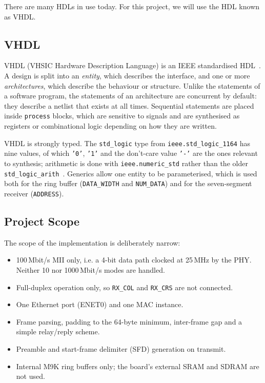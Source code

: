 \documentclass[11pt,a4paper]{article}
\begin{document}
There are many HDLs in use today. For this project, we will use the HDL known as VHDL.

\subsection{VHDL}
VHDL (VHSIC Hardware Description Language) is an IEEE standardised HDL~\cite{ieee1076}.
A design is split into an \emph{entity}, which describes the interface, and one or more \emph{architectures}, which describe the behaviour or structure.
Unlike the statements of a software program, the statements of an architecture are concurrent by default: they describe a netlist that exists at all times.
Sequential statements are placed inside \texttt{process} blocks, which are sensitive to signals and are synthesised as registers or combinational logic depending on how they are written.

VHDL is strongly typed. The \texttt{std\_logic} type from \texttt{ieee.std\_logic\_1164} has nine values, of which \texttt{'0'}, \texttt{'1'} and the don't-care value \texttt{'-'} are the ones relevant to synthesis; arithmetic is done with \texttt{ieee.numeric\_std} rather than the older \texttt{std\_logic\_arith}~\cite{ieee1076}.
Generics allow one entity to be parameterised, which is used both for the ring buffer (\texttt{DATA\_WIDTH} and \texttt{NUM\_DATA}) and for the seven-segment receiver (\texttt{ADDRESS}).

\subsection{Project Scope}
The scope of the implementation is deliberately narrow:
\begin{itemize}
    \item 100\,Mbit/s MII only, i.e. a 4-bit data path clocked at 25\,MHz by the PHY. Neither 10 nor 1000\,Mbit/s modes are handled.
    \item Full-duplex operation only, so \texttt{RX\_COL} and \texttt{RX\_CRS} are not connected.
    \item One Ethernet port (ENET0) and one MAC instance.
    \item Frame parsing, padding to the 64-byte minimum, inter-frame gap and a simple relay/reply scheme.
    \item Preamble and start-frame delimiter (SFD) generation on transmit.
    \item Internal M9K ring buffers only; the board's external SRAM and SDRAM are not used.
\end{itemize}
\end{document}

